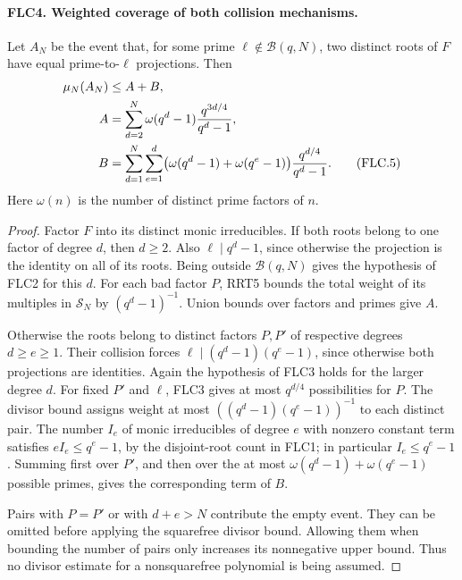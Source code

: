 \paragraph{FLC4. Weighted coverage of both collision mechanisms.}
\label{claim:FLC4}
Let $A_N$ be the event that, for some prime
$\ell\notin\mathcal B(q,N)$, two distinct roots of $F$ have equal
prime-to-$\ell$ projections.  Then
\begin{align}
 \mu_N(A_N)&\le A+B,\notag\\
 A&=\sum_{d=2}^{N}\omega(q^d-1)
                \frac{q^{3d/4}}{q^d-1},\notag\\
 B&=\sum_{d=1}^{N}\sum_{e=1}^{d}
       \bigl(\omega(q^d-1)+\omega(q^e-1)\bigr)
                \frac{q^{d/4}}{q^d-1}.
 \tag{FLC.5}
\end{align}
Here $\omega(n)$ is the number of distinct prime factors of $n$.
\begin{proof}
Factor $F$ into its distinct monic irreducibles.  If both roots
belong to one factor of degree $d$, then $d\ge2$.  Also
$\ell\mid q^d-1$, since otherwise the projection is the identity
on all of its roots.  Being outside $\mathcal B(q,N)$ gives
the hypothesis of FLC2 for this $d$.  For each bad factor $P$,
RRT5 bounds the total weight of its multiples in $\mathcal S_N$
by $(q^d-1)^{-1}$.  Union bounds over factors and primes give $A$.

Otherwise the roots belong to distinct factors $P,P'$ of
respective degrees $d\ge e\ge1$.  Their collision forces
$\ell\mid(q^d-1)(q^e-1)$, since otherwise both projections are
identities.  Again the hypothesis of FLC3 holds for the larger
degree $d$.  For fixed $P'$ and $\ell$, FLC3 gives at most
$q^{d/4}$ possibilities for $P$.  The divisor bound assigns
weight at most $((q^d-1)(q^e-1))^{-1}$ to each distinct pair.
The number $I_e$ of monic irreducibles of degree $e$ with
nonzero constant term satisfies
$eI_e\le q^e-1$, by the disjoint-root count in FLC1; in
particular $I_e\le q^e-1$.  Summing first over $P'$, and then
over the at most $\omega(q^d-1)+\omega(q^e-1)$ possible primes,
gives the corresponding term of $B$.

Pairs with $P=P'$ or with $d+e>N$ contribute the empty event.
They can be omitted before applying the squarefree divisor bound.
Allowing them when bounding the number of pairs only increases
its nonnegative upper bound.  Thus no divisor estimate for a
nonsquarefree polynomial is being assumed.
\end{proof}

